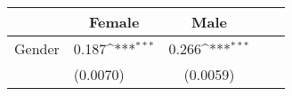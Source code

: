 {
\def\sym#1{\ifmmode^{#1}\else\(^{#1}\)\fi}
\begin{tabular*}{.6\hsize}{@{\hskip\tabcolsep\extracolsep\fill}l*{2}{lc}}
\toprule
                &\multicolumn{1}{c}{Female}&\multicolumn{1}{c}{Male}\\
\midrule
Gender          &    0.187\sym{***}&    0.266\sym{***}\\
                & (0.0070)         & (0.0059)         \\
\bottomrule
\end{tabular*}
}
